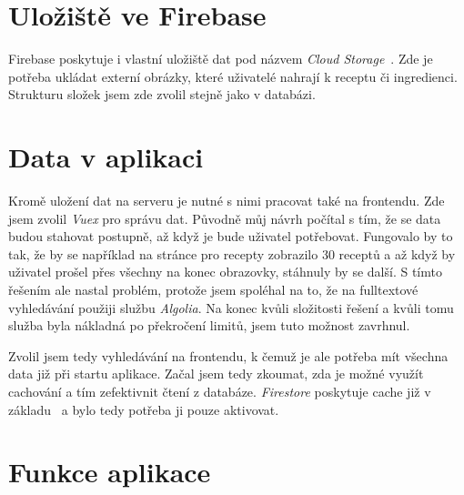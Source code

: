\section{Uložiště ve Firebase}
Firebase poskytuje i vlastní uložiště dat pod názvem \emph{Cloud Storage}~\cite{CloudStorage}. Zde je potřeba ukládat externí obrázky, které uživatelé
nahrají k receptu či ingredienci. Strukturu složek jsem zde zvolil stejně jako v databázi.

\section{Data v aplikaci}
Kromě uložení dat na serveru je nutné s nimi pracovat také na frontendu. Zde jsem zvolil \emph{Vuex} pro správu dat. Původně
můj návrh počítal s tím, že se data budou stahovat postupně, až když je bude uživatel potřebovat. Fungovalo by to tak, že by
se například na stránce pro recepty zobrazilo 30 receptů a až když by uživatel prošel přes všechny na konec obrazovky, stáhnuly
by se další. S tímto řešením ale nastal problém, protože jsem spoléhal na to, že na fulltextové vyhledávání použiji službu
\emph{Algolia}. Na konec kvůli složitosti řešení a kvůli tomu služba byla nákladná po překročení limitů, jsem tuto možnost zavrhnul.

Zvolil jsem tedy vyhledávání na frontendu, k čemuž je ale potřeba mít všechna data již při startu aplikace. Začal jsem tedy
zkoumat, zda je možné využít cachování a tím zefektivnit čtení z databáze. \emph{Firestore} poskytuje cache již v základu~\cite{FirestoreCache} a bylo
tedy potřeba ji pouze aktivovat.

\section{Funkce aplikace}
